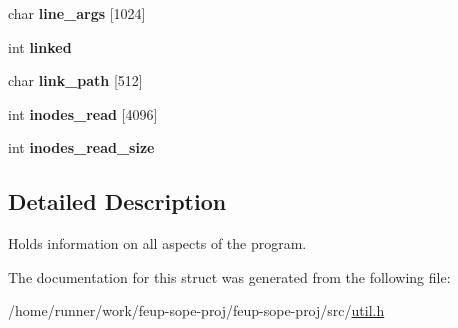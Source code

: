 \begin{DoxyCompactItemize}
\mbox{\label{structflags_aae0bfc8aa157031e0edc8876dd52f1fc}} 
char {\bfseries line\+\_\+args} \mbox{[}1024\mbox{]}
\item 
\mbox{\label{structflags_a28196434d450bfb165e9f5628e2f8e18}} 
int {\bfseries linked}
\item 
\mbox{\label{structflags_a38713f66e8fe37352e7635441983d792}} 
char {\bfseries link\+\_\+path} \mbox{[}512\mbox{]}
\item 
\mbox{\label{structflags_a168e493e45c7035e7acc5317761c8edd}} 
int {\bfseries inodes\+\_\+read} \mbox{[}4096\mbox{]}
\item 
\mbox{\label{structflags_aa52e72b05201b65a89991254aa6a428a}} 
int {\bfseries inodes\+\_\+read\+\_\+size}
\end{DoxyCompactItemize}


\subsection{Detailed Description}
Holds information on all aspects of the program. 

The documentation for this struct was generated from the following file\+:\begin{DoxyCompactItemize}
\item 
/home/runner/work/feup-\/sope-\/proj/feup-\/sope-\/proj/src/\hyperlink{util_8h}{util.\+h}\end{DoxyCompactItemize}
